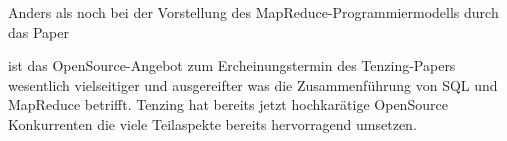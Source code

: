 \documentclass[a4paper]{article}
\begin{document}
Anders als noch bei der Vorstellung des MapReduce-Programmiermodells durch das Paper
\begin{quotation}
\end{quotation}
ist das OpenSource-Angebot zum Ercheinungstermin des Tenzing-Papers wesentlich vielseitiger und ausgereifter was die Zusammenführung von SQL und MapReduce betrifft. Tenzing hat bereits jetzt hochkarätige OpenSource Konkurrenten die viele Teilaspekte bereits hervorragend umsetzen.

\newpage

\nocite{*}
\printbibliography

\newpage
{}
\listoffigures

\listoftables

\renewcommand\listoflistingscaption{Quellcodeverzeichnis}
\listoflistings
\end{document}
